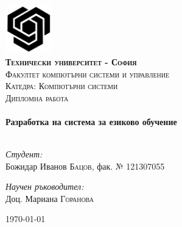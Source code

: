 \begin{titlepage}

\begin{center}


\includegraphics[width=0.15\textwidth]{images/tu-logo.png}\\[1cm]    

\textsc{\LARGE \bfseries Технически университет - София}\\[0.5cm]
\textsc{\Large Факултет компютърни системи и управление}\\[1.0cm]
\textsc{\Large Катедра: Компютърни системи}\\[1.0cm]

\textsc{\Large Дипломна работа}\\[0.5cm]


\HRule \\[0.4cm]
{ \huge \bfseries Разработка на система за езиково обучение}\\[0.4cm]

\HRule \\[1.5cm]

\begin{minipage}{0.4\textwidth}
\begin{flushleft} \large
\emph{Студент:}\\
Божидар Иванов \textsc{Бацов}, фак. № 121307055
\end{flushleft}
\end{minipage}
\begin{minipage}{0.4\textwidth}
\begin{flushright} \large
\emph{Научен ръководител:} \\
Доц. Мариана \textsc{Горанова}
\end{flushright}
\end{minipage}

\vfill

{\large \today}

\end{center}

\end{titlepage}
